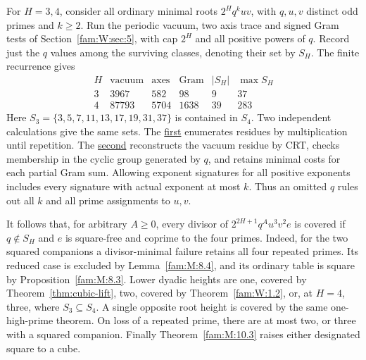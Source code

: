 \documentclass[11pt,a4paper]{article}
\numberwithin{equation}{section}
\theoremstyle{remark}
\begin{document}
For $H=3,4$, consider all ordinary minimal roots $2^Hq^k uv$,
with $q,u,v$ distinct odd primes and $k\ge2$. Run the periodic
vacuum, two axis trace and signed Gram tests of Section~\ref{fam:W:sec:5},
with cap $2^H$ and all positive powers of $q$. Record just the $q$
values among the surviving classes, denoting their set by $S_H$.
The finite recurrence gives
\[
\begin{array}{r|rrrrr}
H & \text{vacuum}&\text{axes}&\text{Gram}& |S_H|&\max S_H\\\hline
3&3967&582&98&9&37\\
4&87793&5704&1638&39&283
\end{array}
\]
Here $S_3=\{3,5,7,11,13,17,19,31,37\}$ is contained in $S_4$.
Two independent calculations give the same sets. The \href{https://github.com/sebastienpalcoux/WGT-fusion-categories/blob/f7f9f9a02f3116e61eb9dca4eebfed77001494e8/code/four_primes/prime_projection.py}{first} enumerates residues by multiplication until repetition. The \href{https://github.com/sebastienpalcoux/WGT-fusion-categories/blob/f7f9f9a02f3116e61eb9dca4eebfed77001494e8/code/four_primes/independent_projection.py}{second} reconstructs the vacuum residue by CRT, checks membership in
the cyclic group generated by $q$, and retains minimal costs for each
partial Gram sum. Allowing exponent signatures for all positive
exponents includes every signature with actual exponent at most $k$.
Thus an omitted $q$ rules out all $k$ and all prime assignments to $u,v$.

It follows that, for arbitrary $A\ge0$, every divisor of
$2^{2H+1}q^A u^3v^2 e$ is covered if $q\notin S_H$ and $e$ is
square-free and coprime to the four primes. Indeed, for the two
squared companions a divisor-minimal failure retains all four
repeated primes. Its reduced case is excluded by Lemma~\ref{fam:M:8.4},
and its ordinary table is square by Proposition~\ref{fam:M:8.3}.
Lower dyadic heights are one, covered by Theorem~\ref{thm:cubic-lift},
two, covered by Theorem~\ref{fam:W:1.2}, or, at $H=4$, three, where
$S_3\subseteq S_4$. A single opposite root height is covered by the
same one-high-prime theorem. On loss of a repeated prime, there
are at most two, or three with a squared companion.
Finally Theorem~\ref{fam:M:10.3} raises either designated square to a cube.
\end{document}
